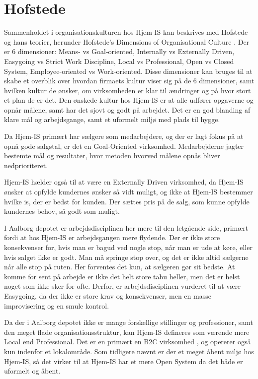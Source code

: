\section{Hofstede}
Sammenholdet i organisationskulturen hos Hjem-IS kan beskrives med Hofstede og hans teorier, herunder Hofstede's Dimensions of Organisational Culture \cite{Quickbase}. 
Der er 6 dimensioner: Means- vs Goal-oriented, Internally vs Externally Driven, Easygoing vs Strict Work Discipline, Local vs Professional, Open vs Closed System, Employee-oriented vs Work-oriented. Disse dimensioner kan bruges til at skabe et overblik over hvordan firmaets kultur viser sig på de 6 dimensioner, samt hvilken kultur de ønsker, om virksomheden er klar til ændringer og på hvor stort et plan de er det. Den ønskede kultur hos Hjem-IS er at alle udfører opgaverne og opnår målene, samt har det sjovt og godt på arbejdet. Det er en god blanding af klare mål og arbejdsgange, samt et uformelt miljø med plads til hygge.

Da Hjem-IS primært har sælgere som medarbejdere, og der er lagt fokus på at opnå gode salgstal, er det en Goal-Oriented virksomhed. Medarbejderne jagter bestemte mål og resultater, hvor metoden hvorved målene opnås bliver nedprioriteret.

Hjem-IS hælder også til at være en Externally Driven virksomhed, da Hjem-IS ønsker at opfylde kundernes ønsker så vidt muligt, og ikke at Hjem-IS bestemmer hvilke is, der er bedst for kunden. Der sættes pris på de salg, som kunne opfylde kundernes behov, så godt som muligt.

I Aalborg depotet er arbejdsdisciplinen her mere til den letgående side, primært fordi at hos Hjem-IS er arbejdsgangen mere flydende. Der er ikke store konsekvenser for, hvis man er bagud ved nogle stop, når man er ude at køre, eller hvis salget ikke er godt. Man må springe stop over, og det er ikke altid sælgerne når alle stop på ruten. Her forventes det kun, at sælgeren gør sit bedste. At komme for sent på arbejde er ikke det helt store tabu heller, men det er helst noget som ikke sker for ofte. Derfor, er arbejdsdisciplinen vurderet til at være Easygoing, da der ikke er store krav og konsekvenser, men en masse improvisering og en smule kontrol.

Da der i Aalborg depotet ikke er mange forskellige stillinger og professioner, samt den meget flade organisationsstruktur, kan Hjem-IS defineres som værende mere Local end Professional. Det er en primært en B2C virksomhed \cite{B2C}, og opererer også kun indenfor et lokalområde. 
Som tidligere nævnt er der et meget åbent miljø hos Hjem-IS, så det virker til at Hjem-IS har et mere Open System da det både er uformelt og åbent. 


